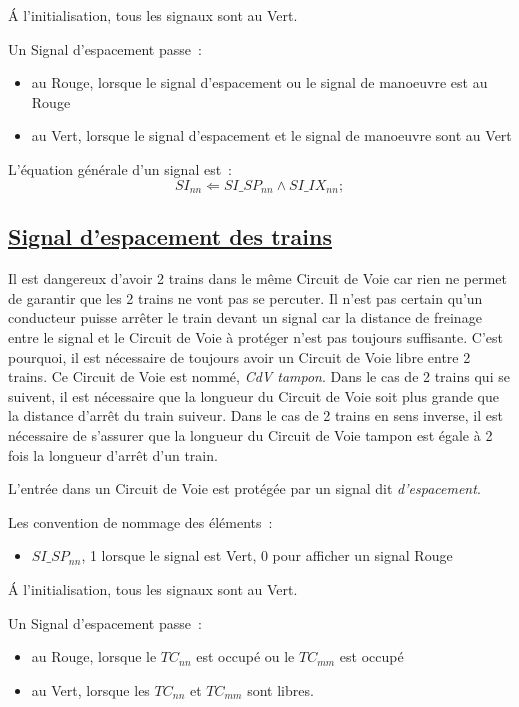 \'A l'initialisation, tous les signaux sont au Vert.

Un Signal d'espacement passe~:
\begin{itemize}
\item au Rouge, lorsque le signal d'espacement ou le signal de
  manoeuvre est au Rouge
\item au Vert, lorsque le signal d'espacement et le signal de
  manoeuvre sont au Vert
\end{itemize}


\medskip
L'équation générale d'un signal est~:
$$\boxed{
  SI_{nn} \Leftarrow SI\_SP_{nn} \land SI\_IX_{nn};
}$$


\subsection{\underline{Signal d'espacement des trains}}
\label{sec:esp}

Il est dangereux d'avoir 2 trains dans le même Circuit de Voie car
rien ne permet de garantir que les 2 trains ne vont pas se
percuter. Il n'est pas certain qu'un conducteur puisse arrêter le
train devant un signal car la distance de freinage entre le signal et
le Circuit de Voie à protéger n'est pas toujours suffisante. C'est
pourquoi, il est nécessaire de toujours avoir un Circuit de Voie libre
entre 2 trains. Ce Circuit de Voie est nommé, \emph{CdV tampon}.  Dans
le cas de 2 trains qui se suivent, il est nécessaire que la longueur
du Circuit de Voie soit plus grande que la distance d'arrêt du train
suiveur.  Dans le cas de 2 trains en sens inverse, il est nécessaire
de s'assurer que la longueur du Circuit de Voie tampon est égale à 2
fois la longueur d'arrêt d'un train.

L'entrée dans un Circuit de Voie est protégée par un signal dit
\emph{d'espacement}.

Les convention de nommage des éléments~:
\begin{itemize}
\item $SI\_SP_{nn}$, 1 lorsque le signal est Vert, 0 pour afficher un
  signal Rouge
\end{itemize}

\'A l'initialisation, tous les signaux sont au Vert.

Un Signal d'espacement passe~:
\begin{itemize}
\item au Rouge, lorsque le $TC_{nn}$ est occupé ou le $TC_{mm}$ est occupé
\item au Vert, lorsque les $TC_{nn}$ et $TC_{mm}$ sont libres.
\end{itemize}

